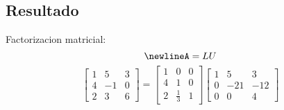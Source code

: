 \documentclass{article}%
\begin{document}
%
\subsection{Resultado}%
\label{subsec:Resultado}%
Factorizacion matricial:%
\[%
\newline%
 A     = L       U%
\]%
\[%
\left[\begin{matrix}1 & 5 & 3\\4 & -1 & 0\\2 & 3 & 6\end{matrix}\right] = \left[\begin{matrix}1 & 0 & 0\\4 & 1 & 0\\2 & \frac{1}{3} & 1\end{matrix}\right] \left[\begin{matrix}1 & 5 & 3\\0 & -21 & -12\\0 & 0 & 4\end{matrix}\right]%
\]

%
\end{document}

